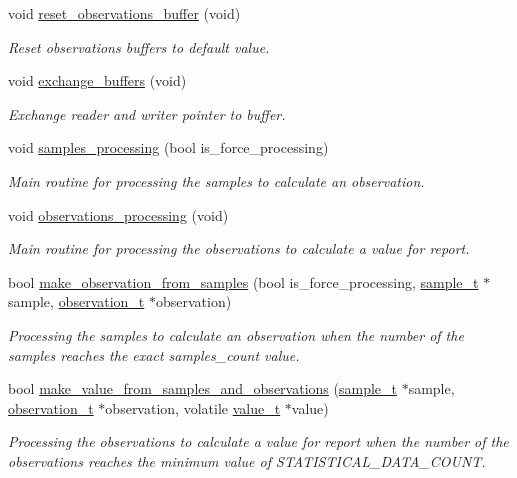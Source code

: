 \begin{DoxyCompactItemize}
void \hyperlink{i2c-th_8h_a49fdbb850fac1a3832e7852a24c31c72}{reset\+\_\+observations\+\_\+buffer} (void)
\begin{DoxyCompactList}\small\item\em Reset observations buffers to default value. \end{DoxyCompactList}\item 
void \hyperlink{i2c-th_8h_aafa3d59a1bde3085849eee08f110612f}{exchange\+\_\+buffers} (void)
\begin{DoxyCompactList}\small\item\em Exchange reader and writer pointer to buffer. \end{DoxyCompactList}\item 
void \hyperlink{i2c-th_8h_aba0fc91d6c2829df00a9d5fe2b921c90}{samples\+\_\+processing} (bool is\+\_\+force\+\_\+processing)
\begin{DoxyCompactList}\small\item\em Main routine for processing the samples to calculate an observation. \end{DoxyCompactList}\item 
void \hyperlink{i2c-th_8h_a8b67eda853f3e8cca0c729267b492861}{observations\+\_\+processing} (void)
\begin{DoxyCompactList}\small\item\em Main routine for processing the observations to calculate a value for report. \end{DoxyCompactList}\item 
bool \hyperlink{i2c-th_8h_a1c5769e114267b210fb3812064d01dd0}{make\+\_\+observation\+\_\+from\+\_\+samples} (bool is\+\_\+force\+\_\+processing, \hyperlink{structsample__t}{sample\+\_\+t} $\ast$sample, \hyperlink{structobservation__t}{observation\+\_\+t} $\ast$observation)
\begin{DoxyCompactList}\small\item\em Processing the samples to calculate an observation when the number of the samples reaches the exact samples\+\_\+count value. \end{DoxyCompactList}\item 
bool \hyperlink{i2c-th_8h_ab301e4d552826ef91458f52963949a1d}{make\+\_\+value\+\_\+from\+\_\+samples\+\_\+and\+\_\+observations} (\hyperlink{structsample__t}{sample\+\_\+t} $\ast$sample, \hyperlink{structobservation__t}{observation\+\_\+t} $\ast$observation, volatile \hyperlink{structvalue__t}{value\+\_\+t} $\ast$value)
\begin{DoxyCompactList}\small\item\em Processing the observations to calculate a value for report when the number of the observations reaches the minimum value of S\+T\+A\+T\+I\+S\+T\+I\+C\+A\+L\+\_\+\+D\+A\+T\+A\+\_\+\+C\+O\+U\+NT. \end{DoxyCompactList}\item 

\end{DoxyCompactItemize}
